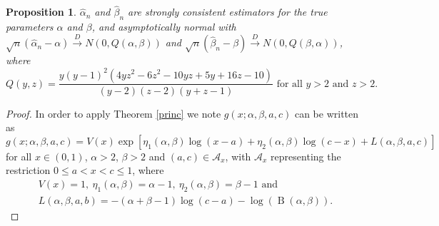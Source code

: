 \documentclass[10pt,a4paper,onecolumn]{article} %
\newtheorem{proposition}[theorem]{Proposition}
\newcommand{\on}{\operatorname}
\begin{document}
\begin{proposition} $\hat\alpha_n$ and $\hat\beta_n$ are strongly consistent estimators for the true parameters $\alpha$ and $\beta$, and asymptotically normal with $\sqrt{n}\left(\hat{\alpha}_n-\alpha\right)\overset{D}{\to} N\left(0,Q(\alpha,\beta)\right)$ and $\sqrt{n}\left(\hat{\beta}_n-\beta\right)\overset{D}{\to} N\left(0,Q(\beta,\alpha)\right)$, where
\begin{equation*}Q(y,z) = \frac{y(y - 1)^2(4yz^2 - 6z^2 - 10yz + 5y + 16z  - 10)}{(y - 2)(z - 2)(y + z - 1)}\mbox{ for all }y>2\mbox{ and }z>2.
\end{equation*}

\end{proposition}
\begin{proof} In order to apply Theorem \ref{princ}
we note $g(x;\alpha,\beta,a,c)$ can be written as \begin{equation*} g(x;\alpha,\beta,a,c)=V(x)\exp\left[\eta_1(\alpha,\beta)\log(x-a)+\eta_2(\alpha,\beta)\log(c-x)+L(\alpha,\beta,a,c)\right]
\end{equation*}
for all $x\in(0,1)$, $\alpha>2$, $\beta>2$ and $(a,c)\in\mathcal{A}_x$, with $\mathcal{A}_x$ representing the restriction $0\leq a<x<c\leq 1$, where
\begin{equation*}
\begin{aligned}V(x)=1,\ \eta_1(\alpha,\beta)=\alpha-1,\ \eta_2(\alpha,\beta)=\beta-1\mbox{ and }\\
L(\alpha,\beta,a,b)=-(\alpha+\beta-1)\log(c-a)-\log(\on{B}(\alpha,\beta)).
\end{aligned} 
\end{equation*}


\end{proof}
\end{document}

